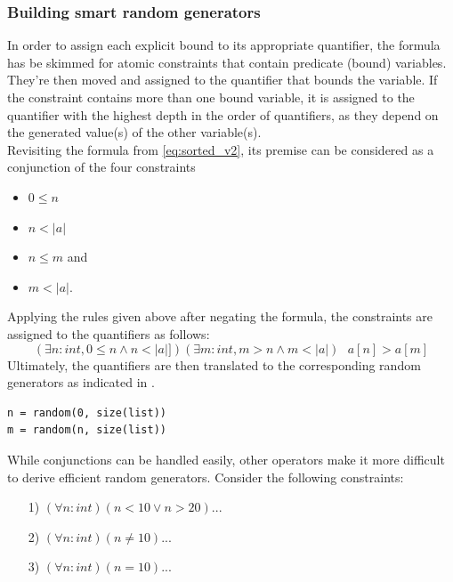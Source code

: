 \subsubsection{Building smart random generators}
In order to assign each explicit bound to its appropriate quantifier, the formula has be skimmed for atomic constraints that contain predicate (bound) variables. They're then moved and assigned to the quantifier that bounds the variable. If the constraint contains more than one bound variable, it is assigned to the quantifier with the highest depth in the order of quantifiers, as they depend on the generated value(s) of the other variable(s). \\
Revisiting the formula from \eqref{eq:sorted_v2}, its premise can be considered as a conjunction of the four constraints
\begin{itemize}
\itemsep-1em
\item $0 \leq n$
\item $n < |a| $
\item $n \le m$ and
\item $m < |a|$.
\end{itemize}
Applying the rules given above after negating the formula, the constraints are assigned to the quantifiers as follows:
\begin{equation}\label{eq:sorted_v2_bounds}
	(\exists n : int, 0 \leq n \wedge n < |a|])(\exists m : int, m > n \wedge m < |a|) \text{ } a[n] > a[m]
\end{equation}
Ultimately, the quantifiers are then translated to the corresponding random generators as indicated in .
\begin{lstlisting}[label=lst:rand]
n = random(0, size(list))
m = random(n, size(list))
\end{lstlisting}
While conjunctions can be handled easily, other operators make it more difficult to derive efficient random generators. Consider the following constraints:
\begin{itemize}
\itemsep-0.7em
\item[1)] $(\forall n : int) (n < 10 \lor n > 20) ...$
\item[2)] $(\forall n : int) (n \ne 10) ...$
\item[3)] $(\forall n : int) (n = 10) ...$
\end{itemize}

